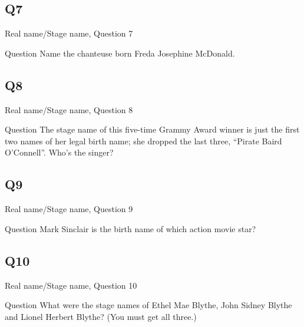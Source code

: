 \documentclass[11pt]{beamer}
\begin{document}
\subsection*{Q7}
\begin{frame}[t]{Real name/Stage name, Question 7}
\begin{block}{Question}
Name the chanteuse born Freda Josephine McDonald.
\end{block}
\end{frame}
\subsection*{Q8}
\begin{frame}[t]{Real name/Stage name, Question 8}
\begin{block}{Question}
The stage name of this five-time Grammy Award winner is just the first two names of her legal birth name; she dropped the last three, ``Pirate Baird O'Connell''. Who's the singer?
\end{block}
\end{frame}
\subsection*{Q9}
\begin{frame}[t]{Real name/Stage name, Question 9}
\begin{block}{Question}
Mark Sinclair is the birth name of which action movie star?
\end{block}
\end{frame}
\subsection*{Q10}
\begin{frame}[t]{Real name/Stage name, Question 10}
\begin{block}{Question}
What were the stage names of Ethel Mae Blythe, John Sidney Blythe and Lionel Herbert Blythe? (You must get all three.)
\end{block}
\end{frame}
\end{document}
